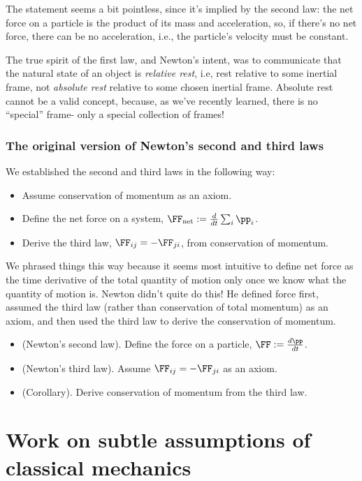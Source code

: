 \documentclass{article}
\begin{document}
The statement seems a bit pointless, since it’s implied by the second law: the net force on a particle is the product of its mass and acceleration, so, if there's no net force, there can be no acceleration, i.e., the particle's velocity must be constant.

The true spirit of the first law, and Newton's intent, was to communicate that the natural state of an object is \textit{relative rest}, i.e, rest relative to some inertial frame, not \textit{absolute rest} relative to some chosen inertial frame. Absolute rest cannot be a valid concept, because, as we've recently learned, there is no ``special'' frame- only a special collection of frames!

\subsubsection*{The original version of Newton's second and third laws}

We established the second and third laws in the following way:

\begin{itemize}
    \item Assume conservation of momentum as an axiom.
    \item Define the net force on a system, $\FF_{\text{net}} := \frac{d}{dt} \sum_i \pp_i$.
    \item Derive the third law, $\FF_{ij} = -\FF_{ji}$, from conservation of momentum.
\end{itemize}

We phrased things this way because it seems most intuitive to define net force as the time derivative of the total quantity of motion only once we know what the quantity of motion is. Newton didn't quite do this! He defined force first, assumed the third law (rather than conservation of total momentum) as an axiom, and then used the third law to derive the conservation of momentum.

\begin{itemize}
    \item (Newton's second law). Define the force on a particle, $\FF := \frac{d\pp}{dt}$.
    \item (Newton's third law). Assume $\FF_{ij} = -\FF_{ji}$ as an axiom.
    \item (Corollary). Derive conservation of momentum from the third law.
\end{itemize}

\section*{Work on subtle assumptions of classical mechanics}
\end{document}
